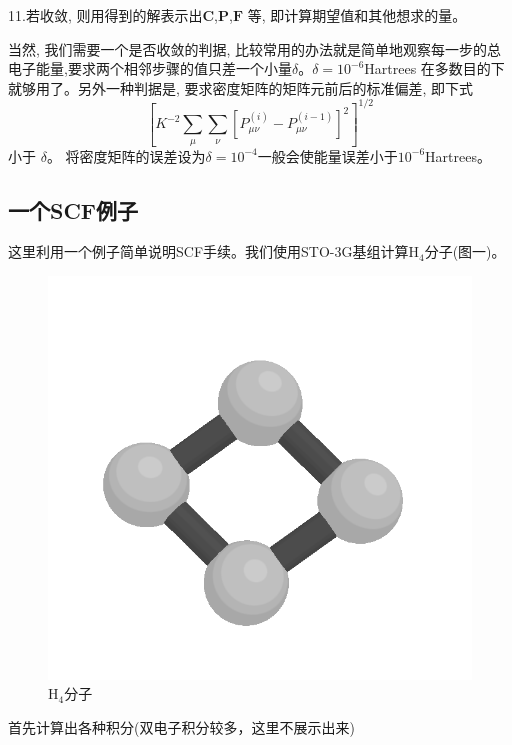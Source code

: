 \documentclass[]{article}
\begin{document}
11.若收敛, 则用得到的解表示出$\mathbf{C}$,$\mathbf{P}$,$\mathbf{F}$ 等, 即计算期望值和其他想求的量。

当然, 我们需要一个是否收敛的判据, 比较常用的办法就是简单地观察每一步的总电子能量,要求两个相邻步骤的值只差一个小量$\delta$。$\delta=10^{-6}$Hartrees 在多数目的下就够用了。另外一种判据是, 要求密度矩阵的矩阵元前后的标准偏差, 即下式
\begin{equation}
	\left[ K^{-2}\sum\limits_{\mu}\sum\limits_{\nu}\left[ P^{(i)}_{\mu\nu}-P^{(i-1)}_{\mu\nu}\right] ^2\right] ^{1/2}
\end{equation}
小于 $\delta$。 将密度矩阵的误差设为$\delta=10^{-4}$一般会使能量误差小于$10^{-6}$Hartrees。
\subsection{一个SCF例子}
这里利用一个例子简单说明SCF手续。我们使用STO-3G基组计算$\mathrm{H}_4$分子(图一)。
\begin{figure}[H]
	\centering
	\includegraphics[scale=0.4]{H4.bmp}
	\caption{$\mathrm{H}_4$分子}
	\label{Figure 1}
\end{figure}
首先计算出各种积分(双电子积分较多，这里不展示出来)
\end{document}
